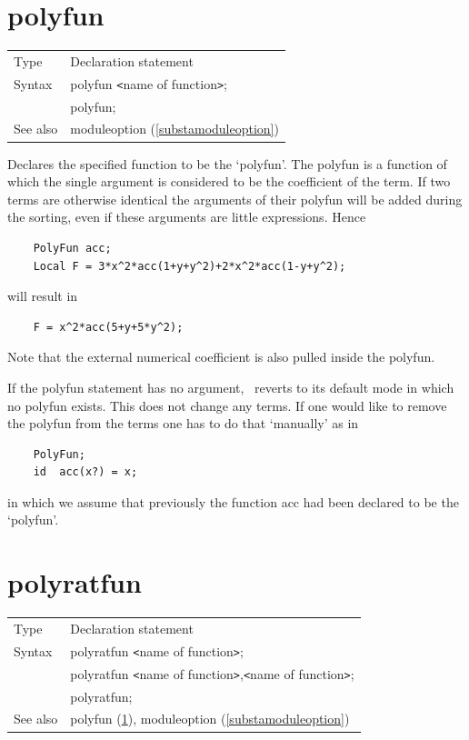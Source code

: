 \section{polyfun}
\label{substapolyfun}

\noindent \begin{tabular}{ll}
Type & Declaration statement\\
Syntax & polyfun {\tt<}name of function{\tt>}; \\
       & polyfun;
\\ See also & moduleoption (\ref{substamoduleoption})
\end{tabular}\vspace{4mm}

\noindent Declares the specified function to be the 
`polyfun'. The polyfun is a function of which the single 
argument is considered to be the 
coefficient of the term. If two terms are otherwise 
identical the arguments of their polyfun will be added during the sorting, 
even if these arguments are little expressions. Hence
\begin{verbatim}
    PolyFun acc;
    Local F = 3*x^2*acc(1+y+y^2)+2*x^2*acc(1-y+y^2);
\end{verbatim}
will result in
\begin{verbatim}
    F = x^2*acc(5+y+5*y^2);
\end{verbatim}
Note that the external numerical coefficient is also 
pulled inside the polyfun.

\noindent If the polyfun statement has no argument, \FORM\ reverts to its 
default mode in which no polyfun exists. This does not change any terms. If 
one would like to remove the polyfun from the terms one has to do that 
`manually' as in
\begin{verbatim}
    PolyFun;
    id  acc(x?) = x;
\end{verbatim}
in which we assume that previously the function acc had been declared to be 
the `polyfun'. \vspace{10mm}


\section{polyratfun}
\label{substapolyratfun}

\noindent \begin{tabular}{ll}
Type & Declaration statement\\
Syntax & polyratfun {\tt<}name of function{\tt>}; \\
       & polyratfun {\tt<}name of function{\tt>},{\tt<}name of function{\tt>}; \\
       & polyratfun;
\\ See also & polyfun (\ref{substapolyfun}),
			  moduleoption (\ref{substamoduleoption})
\end{tabular}\vspace{4mm}

